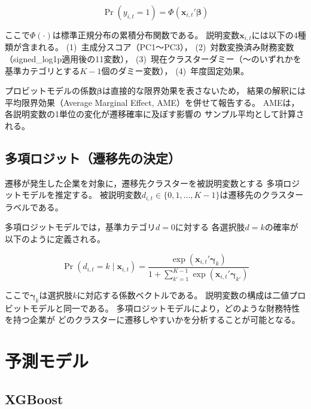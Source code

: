 \begin{equation}
  \Pr(y_{i,t} = 1) = \Phi(\mathbf{x}_{i,t}' \boldsymbol{\beta})
  \label{eq:probit}
\end{equation}

ここで$\Phi(\cdot)$は標準正規分布の累積分布関数である。
説明変数$\mathbf{x}_{i,t}$には以下の4種類が含まれる。
(1)~主成分スコア（PC1〜PC3），
(2)~対数変換済み財務変数（signed\_log1p適用後の11変数），
(3)~現在クラスターダミー（〜のいずれかを基準カテゴリとする$K-1$個のダミー変数），
(4)~年度固定効果。

プロビットモデルの係数$\boldsymbol{\beta}$は直接的な限界効果を表さないため，
結果の解釈には平均限界効果（Average Marginal Effect, AME）を併せて報告する。
AMEは，各説明変数の1単位の変化が遷移確率に及ぼす影響の
サンプル平均として計算される。

\subsection{多項ロジット（遷移先の決定）}
\label{subsec:multinomial}

遷移が発生した企業を対象に，遷移先クラスターを被説明変数とする
多項ロジットモデルを推定する。
被説明変数$d_{i,t} \in \{0, 1, \ldots, K-1\}$は遷移先のクラスターラベルである。

多項ロジットモデルでは，基準カテゴリ$d = 0$に対する
各選択肢$d = k$の確率が以下のように定義される。

\begin{equation}
  \Pr(d_{i,t} = k \mid \mathbf{x}_{i,t}) =
  \frac{\exp(\mathbf{x}_{i,t}' \boldsymbol{\gamma}_k)}
       {1 + \sum_{k'=1}^{K-1} \exp(\mathbf{x}_{i,t}' \boldsymbol{\gamma}_{k'})}
  \label{eq:mlogit}
\end{equation}

ここで$\boldsymbol{\gamma}_k$は選択肢$k$に対応する係数ベクトルである。
説明変数の構成は二値プロビットモデルと同一である。
多項ロジットモデルにより，どのような財務特性を持つ企業が
どのクラスターに遷移しやすいかを分析することが可能となる。

\section{予測モデル}
\label{sec:prediction}

\subsection{XGBoost}
\label{subsec:xgboost}

